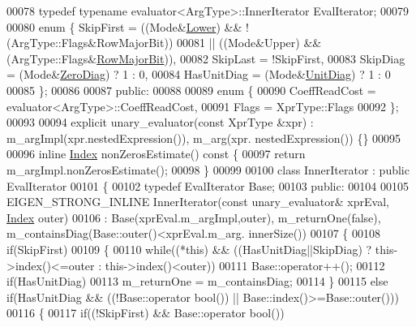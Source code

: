 \begin{DoxyCode}
00078   \textcolor{keyword}{typedef} \textcolor{keyword}{typename} evaluator<ArgType>::InnerIterator EvalIterator;
00079   
00080   \textcolor{keyword}{enum} \{ SkipFirst = ((Mode&\hyperlink{group__enums_gga39e3366ff5554d731e7dc8bb642f83cda891792b8ed394f7607ab16dd716f60e6}{Lower}) && !(ArgType::Flags&RowMajorBit))
00081                     || ((Mode&Upper) &&  (ArgType::Flags&\hyperlink{group__flags_gae4f56c2a60bbe4bd2e44c5b19cbe8762}{RowMajorBit})),
00082          SkipLast = !SkipFirst,
00083          SkipDiag = (Mode&\hyperlink{group__enums_gga39e3366ff5554d731e7dc8bb642f83cda884ff7240392e85aa6e4b3c957e36483}{ZeroDiag}) ? 1 : 0,
00084          HasUnitDiag = (Mode&\hyperlink{group__enums_gga39e3366ff5554d731e7dc8bb642f83cdaddb72f888ac85d5a1c52333e54f9374b}{UnitDiag}) ? 1 : 0
00085   \};
00086   
00087 \textcolor{keyword}{public}:
00088   
00089   \textcolor{keyword}{enum} \{
00090     CoeffReadCost = evaluator<ArgType>::CoeffReadCost,
00091     Flags = XprType::Flags
00092   \};
00093     
00094   \textcolor{keyword}{explicit} unary\_evaluator(\textcolor{keyword}{const} XprType &xpr) : m\_argImpl(xpr.nestedExpression()), m\_arg(xpr.
      nestedExpression()) \{\}
00095   
00096   \textcolor{keyword}{inline} \hyperlink{namespace_eigen_a62e77e0933482dafde8fe197d9a2cfde}{Index} nonZerosEstimate()\textcolor{keyword}{ const }\{
00097     \textcolor{keywordflow}{return} m\_argImpl.nonZerosEstimate();
00098   \}
00099   
00100   \textcolor{keyword}{class }InnerIterator : \textcolor{keyword}{public} EvalIterator
00101   \{
00102       \textcolor{keyword}{typedef} EvalIterator Base;
00103     \textcolor{keyword}{public}:
00104 
00105       EIGEN\_STRONG\_INLINE InnerIterator(\textcolor{keyword}{const} unary\_evaluator& xprEval, \hyperlink{namespace_eigen_a62e77e0933482dafde8fe197d9a2cfde}{Index} outer)
00106         : Base(xprEval.m\_argImpl,outer), m\_returnOne(false), m\_containsDiag(Base::outer()<xprEval.m\_arg.
      innerSize())
00107       \{
00108         \textcolor{keywordflow}{if}(SkipFirst)
00109         \{
00110           \textcolor{keywordflow}{while}((*\textcolor{keyword}{this}) && ((HasUnitDiag||SkipDiag)  ? this->index()<=outer : this->index()<outer))
00111             Base::operator++();
00112           \textcolor{keywordflow}{if}(HasUnitDiag)
00113             m\_returnOne = m\_containsDiag;
00114         \}
00115         \textcolor{keywordflow}{else} \textcolor{keywordflow}{if}(HasUnitDiag && ((!Base::operator \textcolor{keywordtype}{bool}()) || Base::index()>=Base::outer()))
00116         \{
00117           \textcolor{keywordflow}{if}((!SkipFirst) && Base::operator \textcolor{keywordtype}{bool}())

\end{DoxyCode}
